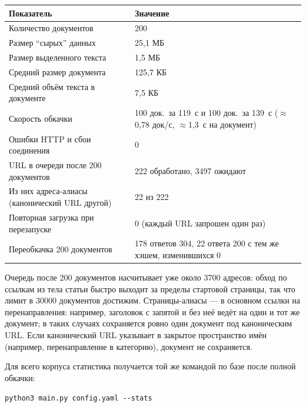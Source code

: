 \begin{tabular}{|p{6.4cm}|p{8.4cm}|}
\hline
Показатель & Значение \\ \hline
Количество документов & 200 \\ \hline
Размер \enquote{сырых} данных & 25{,}1 МБ \\ \hline
Размер выделенного текста & 1{,}5 МБ \\ \hline
Средний размер документа & 125{,}7 КБ \\ \hline
Средний объём текста в документе & 7{,}5 КБ \\ \hline
Скорость обкачки & 100 док.\ за 119~с и 100 док.\ за 139~с
($\approx$0{,}78 док/с, $\approx$1{,}3~с на документ) \\ \hline
Ошибки HTTP и сбои соединения & 0 \\ \hline
URL в очереди после 200 документов & 222 обработано, 3497 ожидают \\ \hline
Из них адреса-алиасы (канонический URL другой) & 22 из 222 \\ \hline
Повторная загрузка при перезапуске & 0 (каждый URL запрошен один раз) \\ \hline
Переобкачка 200 документов & 178 ответов 304, 22 ответа 200 с тем же
хэшем, изменившихся 0 \\ \hline
\end{tabular}

Очередь после 200 документов насчитывает уже около 3700 адресов: обход по
ссылкам из тела статьи быстро выходит за пределы стартовой страницы, так что
лимит в 30000 документов достижим. Страницы-алиасы --- в основном ссылки на
перенаправления: например, заголовок с запятой и без неё ведёт на один и тот же
документ; в таких случаях сохраняется ровно один документ под каноническим
URL. Если канонический URL указывает в закрытое пространство имён (например,
перенаправление в категорию), документ не сохраняется.

Для всего корпуса статистика получается той же командой по базе после полной
обкачки:

\begin{center}\texttt{python3 main.py config.yaml -{}-stats}\end{center}

\pagebreak

